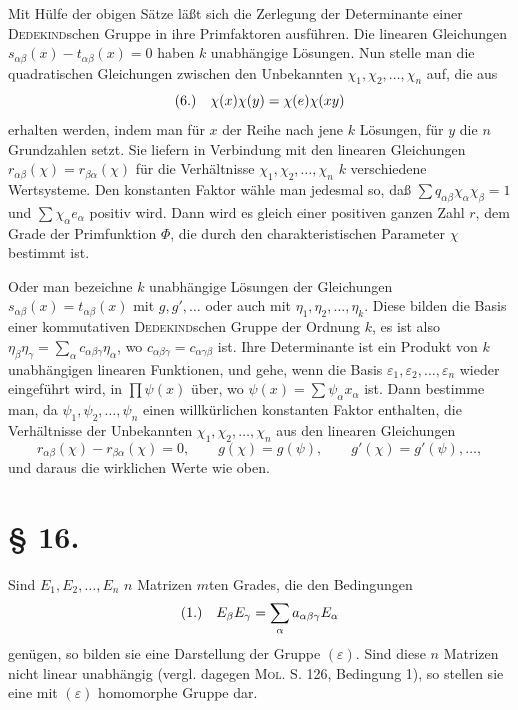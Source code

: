\documentclass[11pt]{article}
\newcommand{\eps}{\varepsilon}
\newcommand{\fnum}[1]{\textup{(\ensuremath{#1}.)}\quad}
\begin{document}
Mit Hülfe der obigen Sätze läßt sich die Zerlegung der Determinante einer \textsc{Dedekind}schen Gruppe in ihre Primfaktoren ausführen. Die linearen Gleichungen $s_{\alpha\beta}(x)-t_{\alpha\beta}(x)=0$ haben $k$ unabhängige Lösungen. Nun stelle man die quadratischen Gleichungen zwischen den Unbekannten $\chi_1,\chi_2,\ldots,\chi_n$ auf, die aus
\[
\fnum{6} \chi(x)\chi(y)=\chi(e)\chi(xy)
\]
erhalten werden, indem man für $x$ der Reihe nach jene $k$ Lösungen, für $y$ die $n$ Grundzahlen setzt. Sie liefern in Verbindung mit den linearen Gleichungen $r_{\alpha\beta}(\chi)=r_{\beta\alpha}(\chi)$ für die Verhältnisse $\chi_1,\chi_2,\ldots,\chi_n$ $k$ verschiedene Wertsysteme. Den konstanten Faktor wähle man jedesmal so, daß $\sum q_{\alpha\beta}\chi_\alpha\chi_\beta=1$ und $\sum\chi_\alpha e_\alpha$ positiv wird. Dann wird es gleich einer positiven ganzen Zahl $r$, dem Grade der Primfunktion $\Phi$, die durch den charakteristischen Parameter $\chi$ bestimmt ist.

Oder man bezeichne $k$ unabhängige Lösungen der Gleichungen $s_{\alpha\beta}(x)=t_{\alpha\beta}(x)$ mit $g,g',\ldots$ oder auch mit $\eta_1,\eta_2,\ldots,\eta_k$. Diese bilden die Basis einer kommutativen \textsc{Dedekind}schen Gruppe der Ordnung $k$, es ist also $\eta_\beta\eta_\gamma=\sum_\alpha c_{\alpha\beta\gamma}\eta_\alpha$, wo $c_{\alpha\beta\gamma}=c_{\alpha\gamma\beta}$ ist. Ihre Determinante ist ein Produkt von $k$ unabhängigen linearen Funktionen, und gehe, wenn die Basis $\eps_1,\eps_2,\ldots,\eps_n$ wieder eingeführt wird, in $\prod\psi(x)$ über, wo $\psi(x)=\sum\psi_\alpha x_\alpha$ ist. Dann bestimme man, da $\psi_1,\psi_2,\ldots,\psi_n$ einen willkürlichen konstanten Faktor enthalten, die Verhältnisse der Unbekannten $\chi_1,\chi_2,\ldots,\chi_n$ aus den linearen Gleichungen
\[
 r_{\alpha\beta}(\chi)-r_{\beta\alpha}(\chi)=0,
 \qquad g(\chi)=g(\psi),
 \qquad g'(\chi)=g'(\psi),\ldots,
\]
und daraus die wirklichen Werte wie oben.

\section*{§ 16.}

Sind $E_1,E_2,\ldots,E_n$ $n$ Matrizen $m$ten Grades, die den Bedingungen
\[
\fnum{1} E_\beta E_\gamma=\sum_\alpha a_{\alpha\beta\gamma}E_\alpha
\]
genügen, so bilden sie eine Darstellung der Gruppe $(\eps)$. Sind diese $n$ Matrizen nicht linear unabhängig (vergl. dagegen \textsc{Mol}. S. 126, Bedingung 1), so stellen sie eine mit $(\eps)$ homomorphe Gruppe dar.
\end{document}
